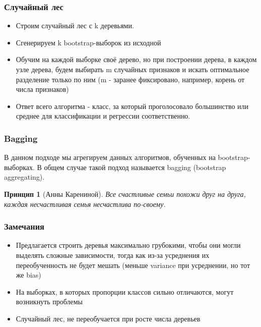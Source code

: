 \documentclass[14pt]{beamer}
\begin{document}
\begin{frame}
\frametitle{Случайный лес}
	  \begin {itemize}
		\item Строим случайный лес с k деревьями.
		\item Сгенерируем k bootstrap-выборок из исходной
		\item Обучим на каждой выборке своё дерево, но при построении дерева, в каждом узле дерева, будем выбирать m случайных признаков и искать оптимальное разделение только по ним (m - заранее фиксировано, например, корень от числа признаков)
		\item Ответ всего алгоритма - класс, за который проголосовало большинство или среднее для классификации и регрессии соответственно.
	  \end {itemize}
\end{frame}

\newtheorem{ruprinciple}{Принцип}

\begin{frame}
\frametitle{Bagging}
        \begin{rudef}
            В данном подходе мы агрегируем данных алгоритмов, обученных на bootstrap-выборках. В общем случае такой подход называется bagging (bootstrap aggregating).
        \end{rudef}
        
        \begin{ruprinciple}[Анны Карениной]
            Все счастливые семьи похожи друг на друга, каждая несчастливая семья несчастлива по-своему.
        \end{ruprinciple}
\end{frame}


\begin{frame}
\frametitle{Замечания}
        \begin{itemize}
            \item Предлагается строить деревья максимально грубокими, чтобы они могли выделять сложные зависимости, тогда как из-за усреднения их переобученность не будет мешать (меньше variance при усреднении, но тот же bias)
            \item На выборках, в которых пропорции классов сильно отличаются, могут возникнуть проблемы
            \item Случайный лес, не переобучается при росте числа деревьев
        \end{itemize}
\end{frame}
\end{document}

